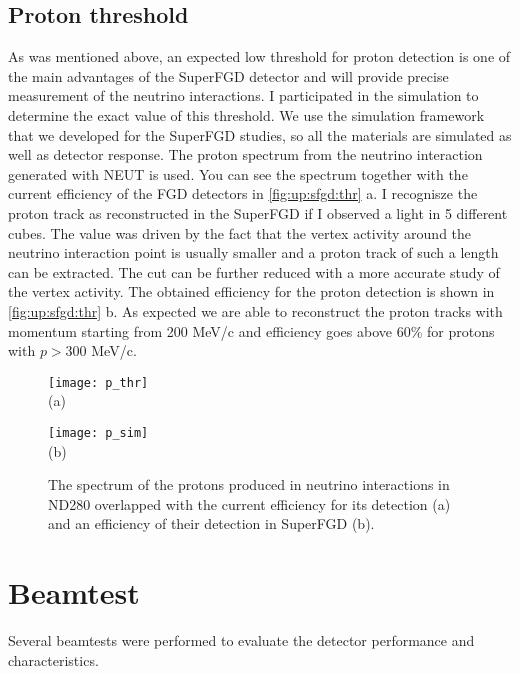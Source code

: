 \documentclass[main.tex]{subfiles}
\begin{document}
\subsection{Proton threshold}
\label{sec:up:sfgd:thr}
As was mentioned above, an expected low threshold for proton detection is one of the main advantages of the SuperFGD detector and will provide precise measurement of the neutrino interactions. I participated in the simulation to determine the exact value of this threshold. We use the simulation framework that we developed for the SuperFGD studies, so all the materials are simulated as well as detector response. The proton spectrum from the neutrino interaction generated with NEUT is used. You can see the spectrum together with the current efficiency of the FGD detectors in \autoref{fig:up:sfgd:thr} a. I recognisze the proton track as reconstructed in the SuperFGD if I observed a light in 5 different cubes. The value was driven by the fact that the vertex activity around the neutrino interaction point is usually smaller and a proton track of such a length can be extracted. The cut can be further reduced with a more accurate study of the vertex activity. The obtained efficiency for the proton detection is shown in \autoref{fig:up:sfgd:thr} b. As expected we are able to reconstruct the proton tracks with momentum starting from 200 MeV/c and efficiency goes above 60\% for protons with $p>300$ MeV/c.

\begin{figure}[!ht]
	\centering
  \begin{minipage}{0.49\linewidth}
    \centering
    \texttt{[image: p\_thr]} \\ (a)
  \end{minipage}
  \begin{minipage}{0.49\linewidth}
    \centering
    \texttt{[image: p\_sim]} \\ (b)
  \end{minipage}
  \caption{The spectrum of the protons produced in neutrino interactions in ND280 overlapped with the current efficiency for its detection (a)  and an efficiency of their detection in  SuperFGD (b).}
  \label{fig:up:sfgd:thr}
\end{figure}

\section{Beamtest}
\label{sec:up:sfgd:beam}
Several beamtests were performed to evaluate the detector performance and characteristics.
\end{document}

